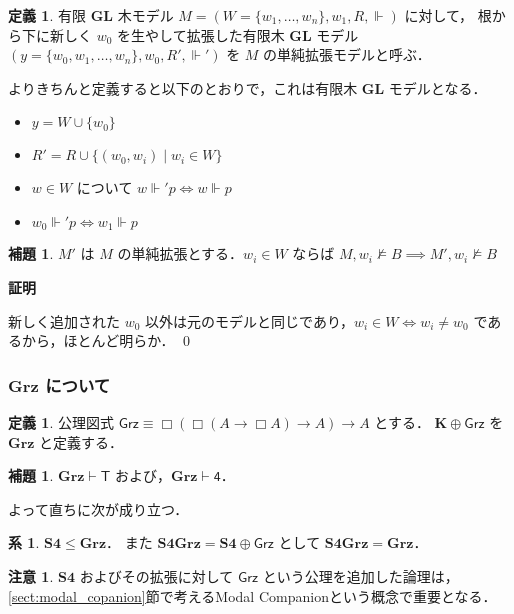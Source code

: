 \documentclass{jsarticle}
\makeatletter
\newcommand*{\Ax}[1]{\mathsf{#1}}
\newcommand*{\AxT}{\Ax{T}}
\newcommand*{\AxFour}{\Ax{4}}
\newcommand*{\AxGrz}{\Ax{Grz}}
\newcommand*{\Logic}[1]{\mathbf{#1}}
\newcommand*{\LogicK}{\Logic{K}}
\newcommand*{\LogicGL}{\Logic{GL}}
\newcommand*{\LogicGrz}{\Logic{Grz}}
\newcommand*{\LogicSFour}{\Logic{S4}}
\newcommand*{\LogicSFourGrz}{\Logic{S4Grz}}
\theoremstyle{definition}
\newtheorem{lemma}[theorem]{補題}
\newtheorem{definition}[theorem]{定義}
\newtheorem{remark}[theorem]{注意}
\newtheorem{corollary}[theorem]{系}
\renewcommand{\proofname}{証明}
\renewenvironment{proof}[1][\proofname]{\par
    \normalfont 
    \topsep6\p@\@plus6\p@\relax
    \trivlist
    \item\relax
    {\bfseries\gtfamily
    #1\@addpunct{.}}\hspace\labelsep\ignorespaces
    }{%
    \endtrivlist
    \@endpefalse
}
\makeatother
\begin{document}
\begin{definition}
	有限 $\LogicGL$ 木モデル $M = (W = \{w_1,\dots,w_n\}, w_1, R, \Vdash)$ に対して，
	根から下に新しく $w_0$ を生やして拡張した有限木 $\LogicGL$ モデル $(y = \{w_0,w_1,\dots,w_n\}, w_0, R', \Vdash')$ を $M$ の単純拡張モデルと呼ぶ．

	よりきちんと定義すると以下のとおりで，これは有限木 $\LogicGL$ モデルとなる．
	\begin{itemize}
		\item $y = W \cup \{w_0\}$
		\item $R' = R \cup \{(w_0,w_i) \mid w_i \in W\}$
		\item $w \in W$ について $w \Vdash' p \iff w \Vdash p$
		\item $w_0 \Vdash' p \iff w_1 \Vdash p$
	\end{itemize}
\end{definition}

\begin{lemma}\label{lem:simple_extension}
	$M'$ は $M$ の単純拡張とする．$w_i \in W$ ならば $M,w_i \nvDash B \implies M',w_i \nvDash B$
\end{lemma}
\begin{proof}
	新しく追加された $w_0$ 以外は元のモデルと同じであり，$w_i \in W \iff w_i \neq w_0$ であるから，ほとんど明らか．
	\qed
\end{proof}

\subsubsection{$\LogicGrz$ について}

\begin{definition}
	公理図式 $\AxGrz \equiv \Box(\Box(A \to \Box A) \to A) \to A$ \index{$\AxGrz$} とする．
	$\LogicK \oplus \AxGrz$ を $\LogicGrz$ と定義する．\index{$\LogicGrz$}
\end{definition}

\begin{lemma}
	$\LogicGrz \vdash \AxT$ および，$\LogicGrz \vdash \AxFour$．
\end{lemma}

よって直ちに次が成り立つ．

\begin{corollary}\label{cor:S4_weakerThan_Grz}
	$\LogicSFour \leq \LogicGrz$．
	また $\LogicSFourGrz = \LogicSFour \oplus \AxGrz$ として $\LogicSFourGrz = \LogicGrz$．
\end{corollary}

\begin{remark}
	$\LogicSFour$ およびその拡張に対して $\AxGrz$ という公理を追加した論理は，
	\ref{sect:modal_copanion}節で考えるModal Companionという概念で重要となる．
\end{remark}
\end{document}
